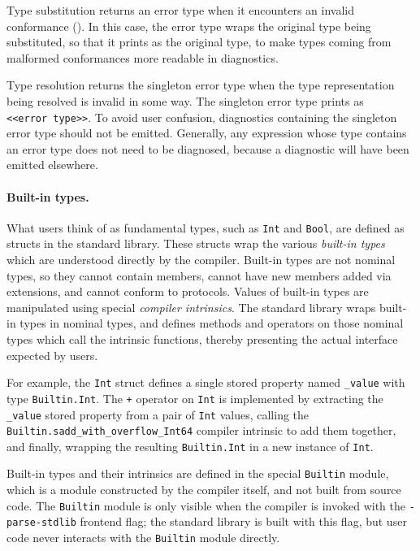 \documentclass[../generics]{subfiles}
\begin{document}
Type substitution returns an error type when it encounters an invalid conformance (). In this case, the error type wraps the original type being substituted, so that it prints as the original type, to make types coming from malformed conformances more readable in diagnostics.

Type resolution returns the singleton error type when the type representation being resolved is invalid in some way. The singleton error type prints as \texttt{<<error~type>>}. To avoid user confusion, diagnostics containing the singleton error type should not be emitted. Generally, any expression whose type contains an error type does not need to be diagnosed, because a diagnostic will have been emitted elsewhere.

\paragraph{Built-in types.}
What users think of as fundamental types, such as \texttt{Int} and \texttt{Bool}, are defined as structs in the standard library. These structs wrap the various \emph{built-in types} which are understood directly by the compiler. Built-in types are not nominal types, so they cannot contain members, cannot have new members added via extensions, and cannot conform to protocols. Values of built-in types are manipulated using special \emph{compiler intrinsics}. The standard library wraps built-in types in nominal types, and defines methods and operators on those nominal types which call the intrinsic functions, thereby presenting the actual interface expected by users.

For example, the \texttt{Int} struct defines a single stored property named \verb|_value| with type \texttt{Builtin.Int}. The \texttt{+} operator on \texttt{Int} is implemented by extracting the \verb|_value| stored property from a pair of \texttt{Int} values, calling the \verb|Builtin.sadd_with_overflow_Int64| compiler intrinsic to add them together, and finally, wrapping the resulting \texttt{Builtin.Int} in a new instance of \texttt{Int}.

Built-in types and their intrinsics are defined in the special \texttt{Builtin} module, which is a module constructed by the compiler itself, and not built from source code. The \texttt{Builtin} module is only visible when the compiler is invoked with the \texttt{-parse-stdlib} frontend flag; the standard library is built with this flag, but user code never interacts with the \texttt{Builtin} module directly.
\end{document}
